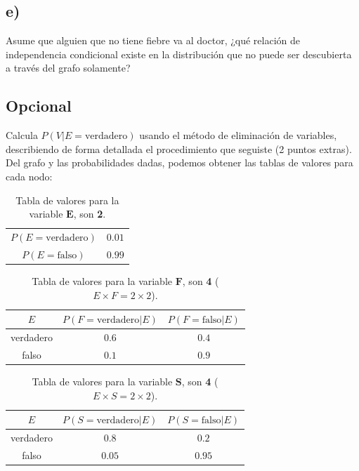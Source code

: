 \documentclass[12pt]{article}
\begin{document}
\subsection{e)} Asume que alguien que no tiene fiebre va al doctor, ¿qué relación de independencia condicional existe en la distribución que no puede ser descubierta a través del grafo solamente?
 \subsection{Opcional} Calcula $P(V|E=\text{verdadero})$ usando el método de eliminación de variables, describiendo de forma detallada el procedimiento que seguiste (2 puntos extras).\\
 Del grafo y las probabilidades dadas, podemos obtener las tablas de valores para cada nodo:\\
 \begin{table}[h!]
 	\centering
 	\begin{tabular}{|c|c|}
 		\hline
 		\rowcolor[gray]{.8}
 		\multicolumn{2}{|c|}{$P(E)$}  \\\hline %
 		$P(E=\text{verdadero})$ & $0.01$\\\hline
 		$P(E=\text{falso})$ & $0.99$\\\hline
 	\end{tabular}
 	\caption{Tabla de valores para la variable $\pmb{E}$, son \textbf{2}.}
 	\label{tab:ej3001}
 \end{table}
\begin{table}[h!]
	\centering
	\begin{tabular}{|c|c|c|}
		\hline
		\rowcolor[gray]{.8}
		$E$&$P(F=\text{verdadero}|E)$&$P(F=\text{falso}|E)$ \\\hline %
		verdadero & $0.6$ &$0.4$\\\hline
		falso & $0.1$ &$0.9$\\\hline
	\end{tabular}
	\caption{Tabla de valores para la variable $\pmb{F}$, son \textbf{4} ($E\times F=2\times 2$).}
	\label{tab:ej3002}
\end{table}
\begin{table}[h!]
	\centering
	\begin{tabular}{|c|c|c|}
		\hline
		\rowcolor[gray]{.8}
		$E$&$P(S=\text{verdadero}|E)$&$P(S=\text{falso}|E)$ \\\hline %
		verdadero & $0.8$ &$0.2$\\\hline
		falso & $0.05$ &$0.95$\\\hline
	\end{tabular}
	\caption{Tabla de valores para la variable $\pmb{S}$, son \textbf{4} ($E\times S=2\times 2$).}
	\label{tab:ej3003}
\end{table}
\end{document}
